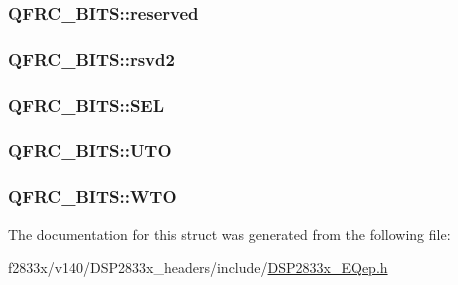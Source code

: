 \subsubsection[{reserved}]{ Q\+F\+R\+C\+\_\+\+B\+I\+T\+S\+::reserved}\label{struct_q_f_r_c___b_i_t_s_a75c7da7a9ada18bd3f79e230a32d67c5}
\hypertarget{struct_q_f_r_c___b_i_t_s_a184f247f6da0b5442e7924c9c2d1e8f1}{}
\subsubsection[{rsvd2}]{ Q\+F\+R\+C\+\_\+\+B\+I\+T\+S\+::rsvd2}\label{struct_q_f_r_c___b_i_t_s_a184f247f6da0b5442e7924c9c2d1e8f1}
\hypertarget{struct_q_f_r_c___b_i_t_s_a636968e699596011e991def743195843}{}
\subsubsection[{S\+E\+L}]{ Q\+F\+R\+C\+\_\+\+B\+I\+T\+S\+::\+S\+E\+L}\label{struct_q_f_r_c___b_i_t_s_a636968e699596011e991def743195843}
\hypertarget{struct_q_f_r_c___b_i_t_s_af4e1fa8397256b95cb031bf4d4010ea9}{}
\subsubsection[{U\+T\+O}]{ Q\+F\+R\+C\+\_\+\+B\+I\+T\+S\+::\+U\+T\+O}\label{struct_q_f_r_c___b_i_t_s_af4e1fa8397256b95cb031bf4d4010ea9}
\hypertarget{struct_q_f_r_c___b_i_t_s_ac1aab146457e3667a4d16850c56103b2}{}
\subsubsection[{W\+T\+O}]{ Q\+F\+R\+C\+\_\+\+B\+I\+T\+S\+::\+W\+T\+O}\label{struct_q_f_r_c___b_i_t_s_ac1aab146457e3667a4d16850c56103b2}


The documentation for this struct was generated from the following file\+:\begin{DoxyCompactItemize}
\item 
f2833x/v140/\+D\+S\+P2833x\+\_\+headers/include/\hyperlink{_d_s_p2833x___e_qep_8h}{D\+S\+P2833x\+\_\+\+E\+Qep.\+h}\end{DoxyCompactItemize}

